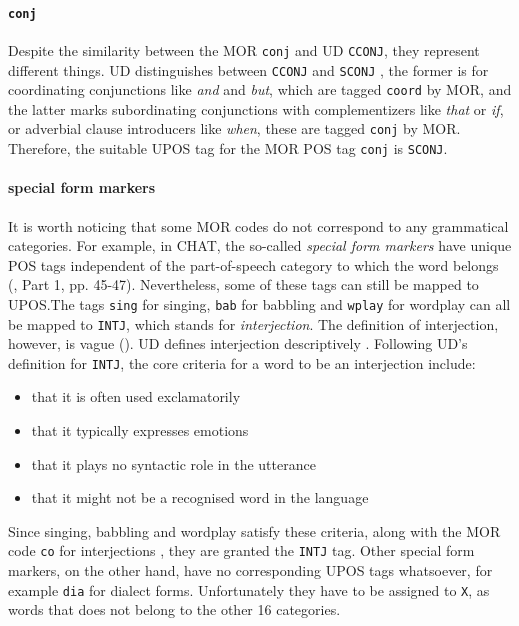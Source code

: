 \paragraph{\texttt{conj}}
Despite the similarity between the MOR \texttt{conj} and UD \texttt{CCONJ}, they represent different things. UD distinguishes between \texttt{CCONJ}  and \texttt{SCONJ} , the former is for coordinating conjunctions like \emph{and} and \emph{but}, which are tagged \texttt{coord} by MOR, and the latter marks subordinating conjunctions with complementizers like \emph{that} or \emph{if}, or adverbial clause introducers like \emph{when}, these are tagged \texttt{conj} by MOR. Therefore, the suitable UPOS tag for the MOR POS tag \texttt{conj} is \texttt{SCONJ}.

\paragraph{special form markers}
It is worth noticing that some MOR codes do not correspond to any grammatical categories. For example, in CHAT, the so-called \emph{special form markers} have unique POS tags independent of the part-of-speech category to which the word belongs (\cite{Macwhinney2000}, Part 1, pp. 45-47). Nevertheless, some of these tags can still be mapped to UPOS.The tags \texttt{sing} for singing, \texttt{bab} for babbling and \texttt{wplay} for wordplay can all be mapped to \texttt{INTJ}, which stands for \emph{interjection}. The definition of interjection, however, is vague (\cite{ameka1992}). UD defines interjection descriptively . Following UD's definition for \texttt{INTJ}, the core criteria for a word  to be an interjection include:
\begin{itemize}
    \item that it is often used exclamatorily
    \item that it typically expresses emotions
    \item that it plays no syntactic role in the utterance
    \item that it might not be a recognised word in the language
\end{itemize}
Since singing, babbling and wordplay satisfy these criteria, along with the MOR code \texttt{co} for interjections , they are granted the \texttt{INTJ} tag. Other special form markers, on the other hand, have no corresponding UPOS tags whatsoever, for example \texttt{dia} for dialect forms. Unfortunately they have to be assigned to \texttt{X}, as words that does not belong to the other 16 categories.

